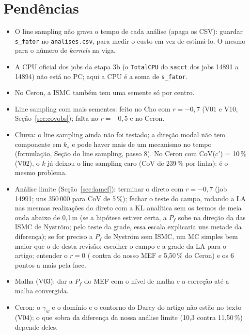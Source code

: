 \documentclass[11pt,a4paper]{article}
\begin{document}
\section{Pendências}
\begin{itemize}
  \item O line sampling não grava o tempo de cada análise (apaga os CSV): guardar \texttt{s\_fator} no
    \texttt{analises.csv}, para medir o custo em vez de estimá-lo. O mesmo para o número de \emph{kernels} na viga.
  \item A CPU oficial dos jobs da etapa 3b (o \texttt{TotalCPU} do \texttt{sacct} dos jobs 14891 a 14894) não está
    no PC; aqui a CPU é a soma de \texttt{s\_fator}.
  \item No Ceron, a ISMC também tem uma semente só por centro.
  \item Line sampling com mais sementes: feito no Cho com $r = -0{,}7$ (V01 e V10, Seção~\ref{sec:covobs}); falta no
    $r = -0{,}5$ e no Ceron.
  \item Chuva: o line sampling ainda não foi testado; a direção modal não tem componente em $k_s$ e pode haver mais de um
    mecanismo no tempo (formulação, Seção do line sampling, passo 8). No Ceron com CoV($c'$) = 10\,\% (V02), o $k$ já
    deixou o line sampling caro (CoV de 239\,\% por linha): é o mesmo problema.
  \item Análise limite (Seção~\ref{sec:lamef}): terminar o direto com $r = -0{,}7$ (job 14991; uns 350\,000 para CoV de
    5\,\%); fechar o teste do campo, rodando a LA nas mesmas realizações do direto com a KL analítica sem os termos de
    meia onda abaixo de 0,1\,m (se a hipótese estiver certa, a $P_f$ sobe na direção da das ISMC de Nyström; pelo teste
    da grade, essa escala explicaria uns metade da diferença); se for preciso a $P_f$ de Nyström sem ISMC, um MC simples
    bem maior que o de \lnyN{} desta revisão; escolher o campo e a grade da LA para o artigo; entender o $r = 0$
    (\lmDirZPf{} contra \lmZmef{} do nosso MEF e 5,50\,\% do Ceron) e os 6 pontos a mais pela face.
  \item Malha (V03): dar a $P_f$ do MEF com o nível de malha e a correção até a malha convergida.
  \item Ceron: o $\gamma_w$ e o domínio e o contorno do Darcy do artigo não estão no texto (V04); o que sobra da
    diferença da nossa análise limite (10,3 contra 11,50\,\%) depende deles.
\end{itemize}
\end{document}
